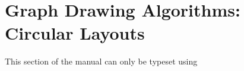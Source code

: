 %
%
%


\section{Graph Drawing Algorithms: Circular Layouts}

{}

\ifluatex
\else
    This section of the manual can only be typeset using 
    \expandafter\endinput
\fi


\includeluadocumentationof{pgf.gd.circular.library}
\includeluadocumentationof{pgf.gd.circular.Tantau2012}


